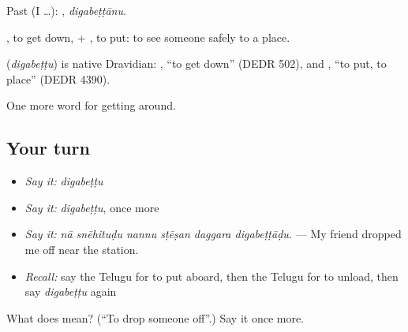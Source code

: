 Past (I …): , \emph{digabeṭṭānu}.

, to get down, + , to put: to see someone safely to a place.

\begin{cousinweb}
\textbf{} (\emph{digabeṭṭu}) is native Dravidian: , \textquotedblleft{}to get down\textquotedblright{} (DEDR 502), and , \textquotedblleft{}to put, to place\textquotedblright{} (DEDR 4390).
\end{cousinweb}

\begin{grammarlens}[title={What you've built}]
One more word for getting around.
\end{grammarlens}

\subsection*{Your turn}
\begin{itemize}
\raggedright
  \item \emph{Say it:} \emph{digabeṭṭu}
  \item \emph{Say it:} \emph{digabeṭṭu}, once more
  \item \emph{Say it:} \emph{nā snēhituḍu nannu sṭēṣan daggara digabeṭṭāḍu.} — My friend dropped me off near the station.
  \item \emph{Recall:} say the Telugu for to put aboard, then the Telugu for to unload, then say \emph{digabeṭṭu} again
\end{itemize}

\begin{tcolorbox}[breakable,colback=teal!4,colframe=teal!35!black,title={Before you move on}]
What does  mean? (\textquotedblleft{}To drop someone off\textquotedblright{}.) Say it once more.
\end{tcolorbox}
